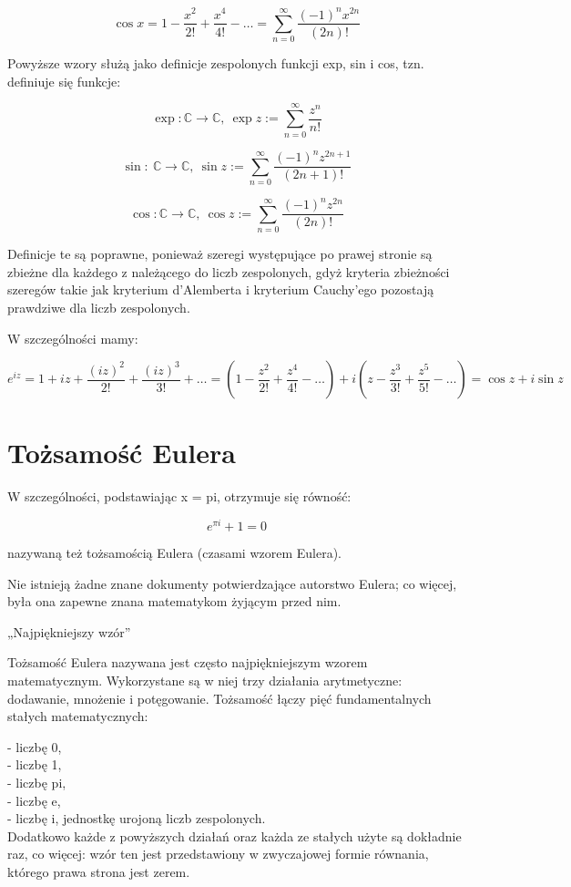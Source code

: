 \documentclass{article}
\begin{document}
\[\cos x=1-{\frac {x^{2}}{2!}}+{\frac {x^{4}}{4!}}-\dots =\sum _{n=0}^{\infty }{\frac {(-1)^{n}x^{2n}}{(2n)!}}\]

Powyższe wzory służą jako definicje zespolonych funkcji exp, sin i cos, tzn. definiuje się funkcje: 


\begin{equation}
	\exp :\mathbb {C} \to \mathbb {C} ,\ \exp z:=\sum _{n=0}^{\infty }{\frac {z^{n}}{n!}}
\end{equation}


\begin{displaymath}
	\sin :\ \mathbb {C} \to \mathbb {C} ,\ \sin z:=\sum _{n=0}^{\infty }{\frac {(-1)^{n}z^{2n+1}}{(2n+1)!}}
\end{displaymath}


\begin{equation*}
	\cos :\mathbb {C} \to \mathbb {C} ,\ \cos z:=\sum _{n=0}^{\infty }{\frac {(-1)^{n}z^{2n}}{(2n)!}}
\end{equation*}

Definicje te są poprawne, ponieważ szeregi występujące po prawej stronie są zbieżne dla każdego z należącego do liczb zespolonych, gdyż kryteria zbieżności szeregów takie jak kryterium d’Alemberta i kryterium Cauchy’ego pozostają prawdziwe dla liczb zespolonych.

W szczególności mamy: 

\begin{equation}
	e^{iz}=1+iz+{\frac {(iz)^{2}}{2!}}+{\frac {(iz)^{3}}{3!}}+\dots =\left(1-{\frac {z^{2}}{2!}}+{\frac {z^{4}}{4!}}-\dots \right)+i\left(z-{\frac {z^{3}}{3!}}+{\frac {z^{5}}{5!}}-\dots \right)=\cos z+i\sin z
\end{equation}

\section*{Tożsamość Eulera}
W szczególności, podstawiając x = pi, otrzymuje się równość:

\begin{displaymath}
	e^{\pi i}+1=0
\end{displaymath}

nazywaną też tożsamością Eulera (czasami wzorem Eulera).

Nie istnieją żadne znane dokumenty potwierdzające autorstwo Eulera; co więcej, była ona zapewne znana matematykom żyjącym przed nim. 

„Najpiękniejszy wzór”

Tożsamość Eulera nazywana jest często najpiękniejszym wzorem matematycznym. Wykorzystane są w niej trzy działania arytmetyczne: dodawanie, mnożenie i potęgowanie. Tożsamość łączy pięć fundamentalnych stałych matematycznych:

- liczbę 0, \\
- liczbę 1, \\
- liczbę pi, \\
- liczbę e, \\
- liczbę i, jednostkę urojoną liczb zespolonych. \\

Dodatkowo każde z powyższych działań oraz każda ze stałych użyte są dokładnie raz, co więcej: wzór ten jest przedstawiony w zwyczajowej formie równania, którego prawa strona jest zerem. 
\end{document}
